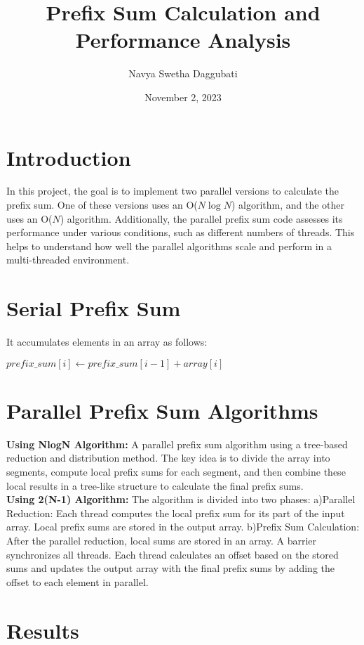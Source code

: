 \documentclass[11pt, twocolumn]{article}
\title{Prefix Sum Calculation and Performance Analysis}
\author{Navya Swetha Daggubati}
\date{November 2, 2023}
\begin{document}
\maketitle

\section{Introduction}
In this project, the goal is to implement two parallel versions to calculate the prefix sum. One of these versions uses an O($N \log N$) algorithm, and the other uses an O($N$) algorithm. Additionally, the parallel prefix sum code assesses its performance under various conditions, such as different numbers of threads. This helps to understand how well the parallel algorithms scale and perform in a multi-threaded environment.

\section{Serial Prefix Sum}
It accumulates elements in an array as follows:
\begin{algorithmic}
  \State $prefix\_sum[i] \gets prefix\_sum[i-1] + array[i]$
\EndFor
\end{algorithmic}
\section{Parallel Prefix Sum Algorithms}
\textbf{Using NlogN Algorithm:} A parallel prefix sum algorithm using a tree-based reduction and distribution method. The key idea is to divide the array into segments, compute local prefix sums for each segment, and then combine these local results in a tree-like structure to calculate the final prefix sums.
 \\
\textbf{Using 2(N-1) Algorithm:} The algorithm is divided into two phases:
a)Parallel Reduction: Each thread computes the local prefix sum for its part of the input array. Local prefix sums are stored in the output array.
b)Prefix Sum Calculation: After the parallel reduction, local sums are stored in an array. A barrier synchronizes all threads. Each thread calculates an offset based on the stored sums and updates the output array with the final prefix sums by adding the offset to each element in parallel.
 \\
\section{Results} 
\end{document}
